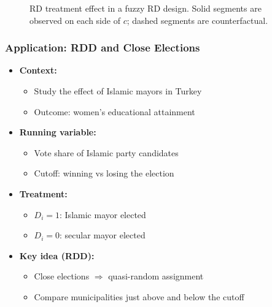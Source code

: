 \documentclass[12pt, compress]{beamer}
\begin{document}
\begin{frame}
\begin{figure}[ht]
	\caption{RD treatment effect in a fuzzy RD design. Solid segments are observed on each side of $c$; dashed segments are counterfactual.}
	\label{fig:FRD-muplus-muminus}
\end{figure}
\end{frame}

\begin{frame}
	\frametitle{Application: RDD and Close Elections}

\begin{itemize}
	\item \textbf{Context:} \citep{meyersson2014islamic}
	\begin{itemize}
		\item Study the effect of Islamic mayors in Turkey
		\item Outcome: women’s educational attainment
	\end{itemize}
	
	\medskip
	
	\item \textbf{Running variable:}
	\begin{itemize}
		\item Vote share of Islamic party candidates
		\item Cutoff: winning vs losing the election
	\end{itemize}
	
	\medskip
	
	\item \textbf{Treatment:}
	\begin{itemize}
		\item $D_i = 1$: Islamic mayor elected
		\item $D_i = 0$: secular mayor elected
	\end{itemize}
	
	\medskip
	
	\item \textbf{Key idea (RDD):}
	\begin{itemize}
		\item Close elections $\Rightarrow$ quasi-random assignment
		\item Compare municipalities just above and below the cutoff
	\end{itemize}
\end{itemize}

\end{frame}
\end{document}
